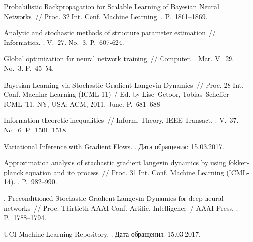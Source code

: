 \documentclass[12pt]{a&t}
\begin{document}
\begin{thebibliography}{10}
 {Probabilistic
  Backpropagation for Scalable Learning of Bayesian Neural Networks}~//
  Proc. 32 Int. Conf. Machine Learning. 
. 
\newblock P.~1861–1869.


 Analytic and
  stochastic methods of structure parameter estimation~//
  {Informatica}. 
. 
\newblock V.~27. No.~3.
\newblock P.~607-624.

 Global optimization for neural network training~//
  {Computer}. 
.  Mar. 
\newblock V.~29. No.~3. 
\newblock P.~45--54.

 Bayesian Learning via Stochastic Gradient Langevin
  Dynamics~// Proc. 28 Int. Conf. Machine
  Learning (ICML-11)~/ Ed. by Lise~Getoor, Tobias~Scheffer. 
\newblock ICML '11. 
\newblock  NY, USA: ACM, 2011. June. 
\newblock P.~681--688.

 Information theoretic inequalities~//
  {Inform. Theory, IEEE Transact.}
. 
\newblock V.~37. No.~6. 
\newblock P.~1501--1518.

 Variational Inference with Gradient Flows.
  . Дата
  обращения: 15.03.2017.

 Approximation analysis of stochastic gradient
  langevin dynamics by using fokker-planck equation and ito process~//
  Proc. 31 Int. Conf. Machine Learning
  (ICML-14). 
. 
\newblock P.~982--990.

.
  Preconditioned Stochastic Gradient Langevin Dynamics for deep neural
  networks~// Proc.  Thirtieth AAAI Conf. Artific.
  Intelligence~/ AAAI Press. 
. 
\newblock P.~1788--1794.

 {UCI} Machine Learning Repository. . Дата обращения: 15.03.2017.


\end{thebibliography}
\end{document}
